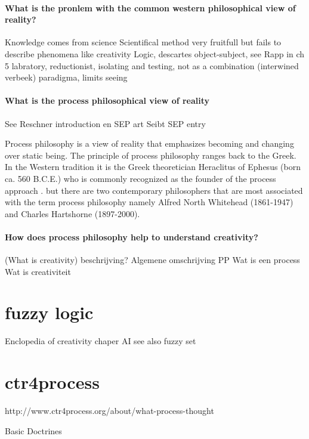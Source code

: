 \documentclass[a4paper]{Thesis}
\begin{document}
\paragraph{What is the pronlem with the common western philosophical view of reality?}
Knowledge comes from science
Scientifical method very fruitfull but fails to describe phenomena like creativity
Logic, descartes object-subject, see Rapp in ch 5
labratory, reductionist, isolating and testing, not as a combination (interwined verbeek)
paradigma, limits seeing

\paragraph{What is the process philosophical view of reality}
See Reschner introduction en SEP art \cite{Rescher-2012-sep}
Seibt SEP entry \cite{Seibt-2013-sep}


Process philosophy is a view of reality that emphasizes becoming and changing over static being. The principle of process philosophy ranges back to the Greek.
In the Western tradition it is the Greek theoretician Heraclitus of Ephesus (born ca. 560 B.C.E.) who is commonly recognized as the founder of the process approach \cite{Seibt-2013-sep}. 
but there are two contemporary philosophers that are most associated with the term process philosophy namely Alfred North Whitehead (1861-1947) and Charles Hartshorne (1897-2000).



\paragraph{How does process philosophy help to understand creativity?}

\paragragph(What is creativity)
beschrijving?
Algemene omschrijving PP
Wat is een process
Wat is creativiteit




\section{fuzzy logic}
Enclopedia of creativity chaper AI
see also fuzzy set


\section{ctr4process}
http://www.ctr4process.org/about/what-process-thought

Basic Doctrines
\end{document}
